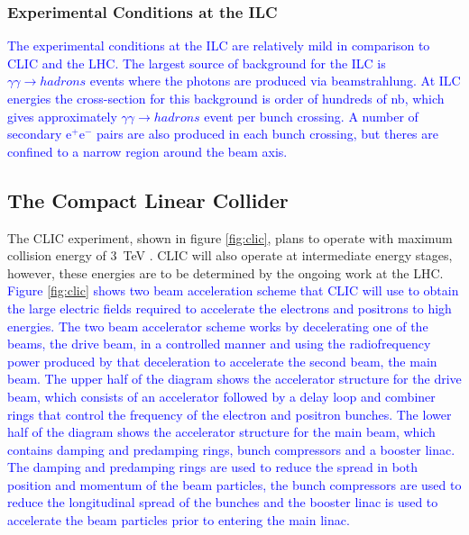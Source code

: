 
\subsubsection{Experimental Conditions at the ILC}
\textcolor{blue}{The experimental conditions at the ILC are relatively mild in comparison to CLIC and the LHC.  The largest source of background for the ILC is $\gamma\gamma \rightarrow hadrons$ events where the photons are produced via beamstrahlung.  At ILC energies the cross-section for this background is order of hundreds of nb, which gives approximately $\gamma\gamma \rightarrow hadrons$ event per bunch crossing.  A number of secondary $\text{e}^{+}\text{e}^{-}$ pairs are also produced in each bunch crossing, but theres are confined to a narrow region around the beam axis.}


\subsection{The Compact Linear Collider}
The CLIC experiment, shown in figure \ref{fig:clic}, plans to operate with maximum collision energy of 3~TeV \cite{Linssen:2012hp, CLIC:2016zwp}.  CLIC will also operate at intermediate energy stages, however, these energies are to be determined by the ongoing work at the LHC.  \textcolor{blue}{Figure \ref{fig:clic} shows two beam acceleration scheme \cite{Aicheler:2012bya} that CLIC will use to obtain the large electric fields required to accelerate the electrons and positrons to high energies.  The two beam accelerator scheme works by decelerating one of the beams, the drive beam, in a controlled manner and using the radiofrequency power produced by that deceleration to accelerate the second beam, the main beam.  The upper half of the diagram shows the accelerator structure for the drive beam, which consists of an accelerator followed by a delay loop and combiner rings that control the frequency of the electron and positron bunches.  The lower half of the diagram shows the accelerator structure for the main beam, which contains damping and predamping rings, bunch compressors and a booster linac.  The damping and predamping rings are used to reduce the spread in both position and momentum of the beam particles, the bunch compressors are used to reduce the longitudinal spread of the bunches and the booster linac is used to accelerate the beam particles prior to entering the main linac.}

